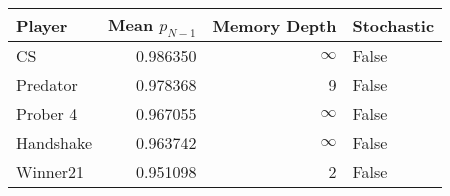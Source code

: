 \begin{tabular}{lrrl}
\toprule
    Player &  Mean $p_{N-1}$ &  Memory Depth & Stochastic \\
\midrule
        CS &        0.986350 &            \(\infty\) &      False \\
  Predator &        0.978368 &             9 &      False \\
  Prober 4 &        0.967055 &            \(\infty\) &      False \\
 Handshake &        0.963742 &            \(\infty\) &      False \\
  Winner21 &        0.951098 &             2 &      False \\
\bottomrule
\end{tabular}

